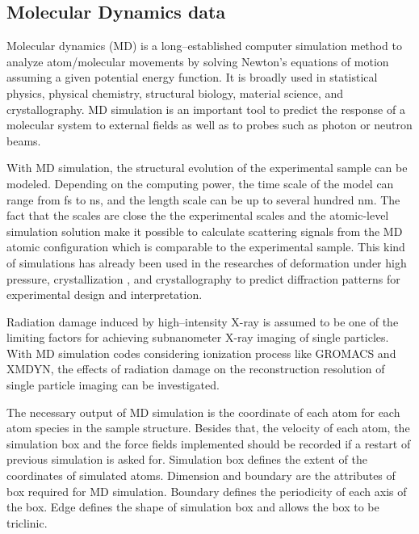 \documentclass[11pt, a4paper]{article}
\begin{document}
\subsection{Molecular Dynamics data}
Molecular dynamics (MD) is a long--established computer simulation method to analyze atom/molecular movements by solving Newton's
equations of motion assuming a given potential energy function. It is broadly used in statistical physics, physical chemistry,
structural biology, material science, and crystallography. MD simulation is an important tool to predict the response of a
molecular system to external fields as well as to probes such as photon or neutron beams.

With MD simulation, the structural evolution of the experimental sample can be modeled. Depending on the computing power, the time scale
of the model can range from fs to ns, and the length scale can be up to several hundred nm. The fact that the scales are
close the the experimental scales and the atomic-level simulation solution make it possible to calculate
scattering signals from the MD atomic configuration which is comparable to the experimental sample. This kind of simulations has already
been used in the researches of deformation under high pressure\cite{kimminau2008jpcm,tang2017jap,tang2018jsr,zhang2019jsr},
crystallization \cite{e2015}, and crystallography \cite{coleman2013msmse} to predict diffraction patterns for experimental design
and interpretation.

Radiation damage induced by high--intensity X-ray is assumed to be one of the limiting factors
for achieving subnanometer X-ray imaging of single particles\cite{caleman2011acsn}. With MD simulation codes considering ionization
process like GROMACS\cite{lindahl2001} and XMDYN\cite{jurek2016}, the effects of radiation damage on the reconstruction resolution
of single particle imaging can be investigated.

The necessary output of MD simulation is the coordinate of each atom for each atom species in the sample structure. Besides that, the velocity of each atom,
the simulation box and the force fields implemented should be recorded if a restart of previous simulation is asked for. Simulation box defines the extent of
the coordinates of simulated atoms. Dimension and boundary are the attributes of box required for MD simulation. Boundary defines the periodicity of each axis of the box.
Edge defines the shape of simulation box and allows the box to be triclinic.
\end{document}
